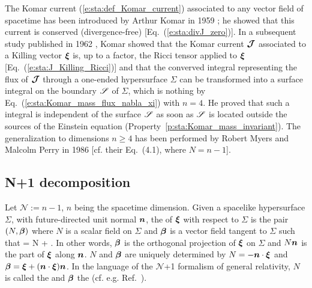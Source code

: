 \begin{hist}
The Komar current (\ref{e:sta:def_Komar_current}) associated to any vector field
of spacetime has been introduced by Arthur Komar in 1959 \cite{Komar59};
he showed that this current is conserved (divergence-free) [Eq.~(\ref{e:sta:divJ_zero})].
In a subsequent study published in  1962 \cite{Komar62}, Komar showed that
the Komar current $\bm{\mathcal{J}}$ associated to a Killing vector $\bm{\xi}$ is, up to a factor, the
Ricci tensor applied to $\bm{\xi}$ [Eq.~(\ref{e:sta:J_Killing_Ricci})] and that
the converved integral representing the flux of $\bm{\mathcal{J}}$ through a one-ended hypersurface $\Sigma$
can be transformed into a surface integral on the boundary $\mathscr{S}$ of $\Sigma$,
which is nothing by Eq.~(\ref{e:sta:Komar_mass_flux_nabla_xi}) with $n=4$.
He proved that such a integral is independent of the surface $\mathscr{S}$ as soon as
$\mathscr{S}$ is located outside the sources of the Einstein equation
(Property~\ref{p:sta:Komar_mass_invariant}). The generalization to
dimensions $n\geq 4$ has been performed by
Robert Myers and Malcolm Perry in 1986 \cite{MyersP86}
[cf. their Eq.~(4.1), where $N=n-1$].
\end{hist}

\subsection{N+1 decomposition} \label{s:sta:np1_decomp}

Let $\mathcal{N} := n - 1$, $n$ being the spacetime dimension.
Given a spacelike hypersurface $\Sigma$, with future-directed unit normal
$\bm{n}$,
the 
of $\bm{\xi}$ with respect to $\Sigma$
is the pair $(N, \bm{\beta})$ where $N$ is a scalar field on $\Sigma$
and $\bm{\beta}$ is a vector field tangent to $\Sigma$ such that
\be \label{e:sta:xi_3p1}
    \w{\xi} = N  + \w{\beta} .
\ee
In other words, $\bm{\beta}$ is the orthogonal projection of $\bm{\xi}$ on $\Sigma$
and $N \bm{n}$ is the part of $\bm{\xi}$ along $\bm{n}$.
$N$ and $\bm{\beta}$ are uniquely determined by
$N = - \bm{n}\cdot\bm{\xi}$ and
$\bm{\beta} = \bm{\xi} + (\bm{n}\cdot\bm{\xi}) \bm{n}$.
In the language of the $\mathcal{N}$+1 formalism of general
relativity, $N$ is called the 
and $\bm{\beta}$ the  (cf. e.g. Ref.~\cite{Gourg12}).


